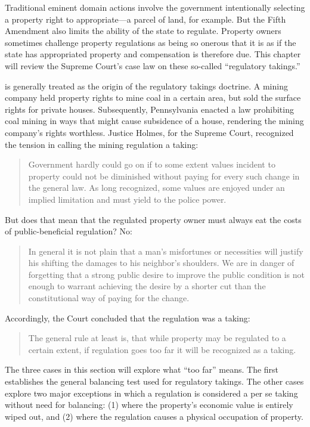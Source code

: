 Traditional eminent domain actions involve the government intentionally
selecting a property right to appropriate---a parcel of land, for example. But
the Fifth Amendment also limits the ability of the state to regulate. Property
owners sometimes challenge property regulations as being so onerous that it is
as if the state has appropriated property and compensation is therefore due.
This chapter will review the Supreme Court's case law on these so-called
``regulatory takings.''


 is generally treated as the origin of the regulatory takings
doctrine. A mining company held property rights to mine coal in a certain area,
but sold the surface rights for private houses. Subsequently, Pennsylvania
enacted a law prohibiting coal mining in ways that might cause subsidence of a
house, rendering the mining company's rights worthless. Justice Holmes, for the
Supreme Court, recognized the tension in calling the mining regulation a taking:
\begin{quote}
Government hardly could go on if to some extent values incident to property
could not be diminished without paying for every such change in the general law.
As long recognized, some values are enjoyed under an implied limitation and must
yield to the police power.
\end{quote}
But does that mean that the regulated property owner must always eat the costs
of public-beneficial regulation? No:
\begin{quote}
In general it is not plain that a man's misfortunes or necessities will justify
his shifting the damages to his neighbor's shoulders. We are in danger of
forgetting that a strong public desire to improve the public condition is not
enough to warrant achieving the desire by a shorter cut than the constitutional
way of paying for the change.
\end{quote}
Accordingly, the Court concluded that the regulation was a taking:
\begin{quote}
The general rule at least is, that while property may be regulated to a certain
extent, if regulation goes too far it will be recognized as a taking.
\end{quote}
The three cases in this section will explore what ``too far'' means. The first
establishes the general balancing test used for regulatory takings. The other
cases explore two major exceptions in which a regulation is considered a per se
taking without need for balancing: (1) where the property's economic value is
entirely wiped out, and (2) where the regulation causes a physical occupation of
property.

